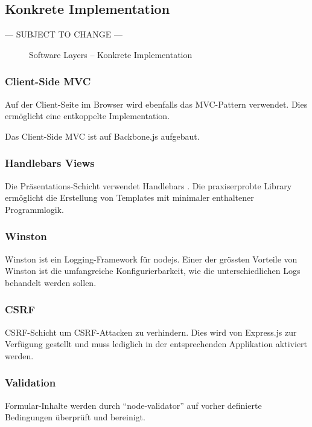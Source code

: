 \subsection*{Konkrete Implementation}

--- SUBJECT TO CHANGE ---

\begin{figure}[H]
	\centering{
		
	}

	\caption{Software Layers -- Konkrete Implementation}
\end{figure}

\newpage
\subsubsection*{Client-Side MVC}
Auf der Client-Seite im Browser wird ebenfalls das MVC-Pattern \cite{MVC}verwendet. Dies ermöglicht eine entkoppelte Implementation.

Das Client-Side MVC ist auf Backbone.js \cite{Backbonejs} aufgebaut.

\subsubsection*{Handlebars Views}
Die Präsentations-Schicht verwendet Handlebars \cite{Handlebars}. Die praxiserprobte Library ermöglicht die Erstellung von Templates mit minimaler enthaltener Programmlogik.

\subsubsection*{Winston}
Winston \cite{Winston} ist ein Logging-Framework für \gls{nodejs}. Einer der grössten Vorteile von Winston ist die umfangreiche Konfigurierbarkeit, wie die unterschiedlichen Logs behandelt werden sollen.

\subsubsection*{CSRF}
\gls{CSRF}-Schicht um CSRF-Attacken zu verhindern. Dies wird von Express.js zur Verfügung gestellt \cite{ExpressjsCSRF} und muss lediglich in der entsprechenden Applikation aktiviert werden.

\subsubsection*{Validation}
Formular-Inhalte werden durch ``node-validator'' \cite{nodevalidator} auf vorher definierte Bedingungen überprüft und bereinigt.

